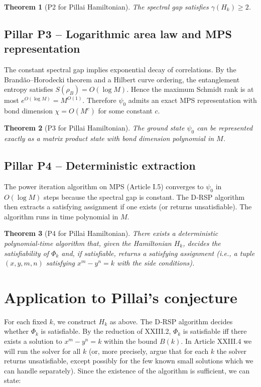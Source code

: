 \documentclass[11pt,a4paper]{article}
\newtheorem{theorem}{Theorem}[section]
\begin{document}
\begin{theorem}[P2 for Pillai Hamiltonian]
The spectral gap satisfies $\gamma(H_k) \ge 2$.
\end{theorem}

\subsection{Pillar P3 – Logarithmic area law and MPS representation}
The constant spectral gap implies exponential decay of correlations. By the Brandão–Horodecki theorem and a Hilbert curve ordering, the entanglement entropy satisfies $S(\rho_B) = O(\log M)$. Hence the maximum Schmidt rank is at most $e^{O(\log M)} = M^{O(1)}$. Therefore $\psi_0$ admits an exact MPS representation with bond dimension $\chi = O(M^c)$ for some constant $c$.

\begin{theorem}[P3 for Pillai Hamiltonian]
The ground state $\psi_0$ can be represented exactly as a matrix product state with bond dimension polynomial in $M$.
\end{theorem}

\subsection{Pillar P4 – Deterministic extraction}
The power iteration algorithm on MPS (Article I.5) converges to $\psi_0$ in $O(\log M)$ steps because the spectral gap is constant. The D‑RSP algorithm then extracts a satisfying assignment if one exists (or returns unsatisfiable). The algorithm runs in time polynomial in $M$.

\begin{theorem}[P4 for Pillai Hamiltonian]
There exists a deterministic polynomial‑time algorithm that, given the Hamiltonian $H_k$, decides the satisfiability of $\Phi_k$ and, if satisfiable, returns a satisfying assignment (i.e., a tuple $(x,y,m,n)$ satisfying $x^m - y^n = k$ with the side conditions).
\end{theorem}

\section{Application to Pillai's conjecture}

For each fixed $k$, we construct $H_k$ as above. The D‑RSP algorithm decides whether $\Phi_k$ is satisfiable. By the reduction of XXIII.2, $\Phi_k$ is satisfiable iff there exists a solution to $x^m - y^n = k$ within the bound $B(k)$. In Article XXIII.4 we will run the solver for all $k$ (or, more precisely, argue that for each $k$ the solver returns unsatisfiable, except possibly for the few known small solutions which we can handle separately). Since the existence of the algorithm is sufficient, we can state:
\end{document}
